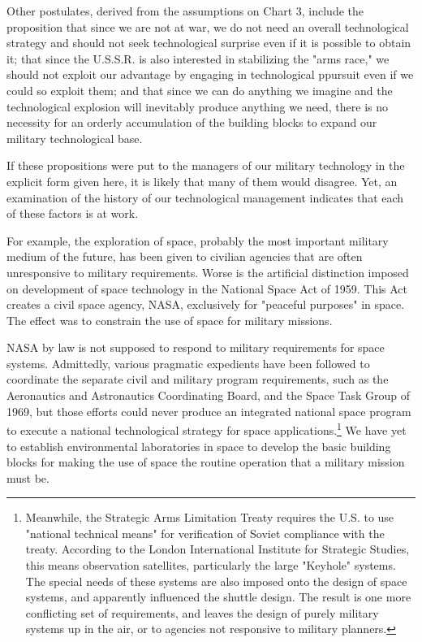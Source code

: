 Other postulates, derived from the assumptions on Chart 3, include the proposition that since we are not at war, we do not need an overall technological strategy and should not seek technological surprise even if it is possible to obtain it; that since the U.S.S.R. is also interested in stabilizing the "arms race," we should not exploit our advantage by engaging in technological ppursuit even if we could so exploit them; and that since we can do anything we imagine and the technological explosion will inevitably produce anything we need, there is no necessity for an orderly accumulation of the building blocks to expand our military technological base.

If these propositions were put to the managers of our military technology in the explicit form given here, it is likely that many of them would disagree. Yet, an examination of the history of our technological management indicates that each of these factors is at work.

For example, the exploration of space, probably the most important military medium of the future, has been given to civilian agencies that are often unresponsive to military requirements. Worse is the artificial distinction imposed on development of space technology in the National Space Act of 1959. This Act creates a civil space agency, NASA, exclusively for "peaceful purposes" in space. The effect was to constrain the use of space for military missions.

NASA by law is not supposed to respond to military requirements for space systems. Admittedly, various pragmatic expedients have been followed to coordinate the separate civil and military program requirements, such as the Aeronautics and Astronautics Coordinating Board, and the Space Task Group of 1969, but those efforts could never produce an integrated national space program to execute a national technological strategy for space applications.\footnote{
Meanwhile, the Strategic Arms Limitation Treaty requires the U.S. to use "national technical means" for verification of Soviet compliance with the treaty. According to the London International Institute for Strategic Studies, this means observation satellites, particularly the large "Keyhole" systems. The special needs of these systems are also imposed onto the design of space systems, and apparently influenced the shuttle design. The result is one more conflicting set of requirements, and leaves the design of purely military systems up in the air, or to agencies not responsive to military planners.
}  We have yet to establish environmental laboratories in space to develop the basic building blocks for making the use of space the routine operation that a military mission must be.

